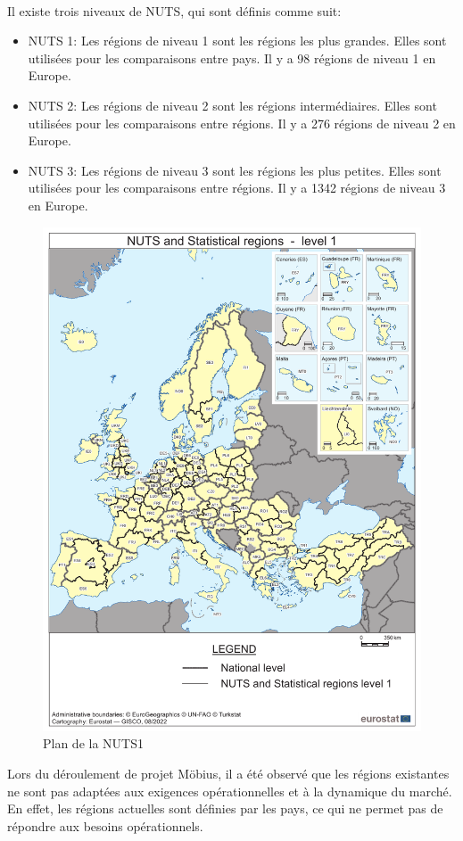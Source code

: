 \paragraph{}
\vspace{-2em}
Il existe trois niveaux de NUTS, qui sont définis comme suit:
\begin{itemize}
    \item NUTS 1: Les régions de niveau 1 sont les régions les plus grandes. Elles sont utilisées pour les comparaisons entre pays. Il y a 98 régions de niveau 1 en Europe.
    \item NUTS 2: Les régions de niveau 2 sont les régions intermédiaires. Elles sont utilisées pour les comparaisons entre régions. Il y a 276 régions de niveau 2 en Europe.
    \item NUTS 3: Les régions de niveau 3 sont les régions les plus petites. Elles sont utilisées pour les comparaisons entre régions. Il y a 1342 régions de niveau 3 en Europe.
\end{itemize}
\begin{figure}[H]
    \centering
    \includegraphics[width=0.45\linewidth]{./Graphismes-UTC/logos/Amazon/NUTS1.pdf}\hfill
    \caption{Plan de la NUTS1}
\end{figure}

Lors du déroulement de projet Möbius, il a été observé que les régions existantes ne sont pas adaptées aux exigences opérationnelles et à la dynamique du marché. En effet, les régions actuelles sont définies par les pays, ce qui ne permet pas de répondre aux besoins opérationnels. 

